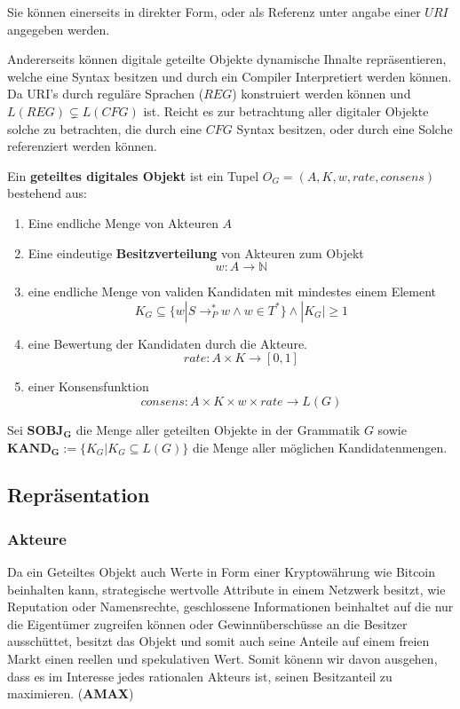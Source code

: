 \documentclass[]{article}
\newtheorem{mydef}{Definition}
\begin{document}
Sie können einerseits in direkter Form, oder als Referenz unter angabe einer $URI$ angegeben werden.

Andererseits können digitale geteilte Objekte dynamische Ihnalte repräsentieren, welche eine Syntax besitzen und durch ein Compiler Interpretiert werden können. Da URI's durch reguläre Sprachen ($REG$) konstruiert werden können und $L(REG) \subsetneq L(CFG)$ ist. Reicht es zur betrachtung aller digitaler Objekte 
solche zu betrachten, die durch eine $CFG$ Syntax besitzen, oder durch eine Solche referenziert werden können.

Ein \textbf{geteiltes digitales Objekt} ist ein Tupel $O_G=(A, K, w, rate, consens)$ bestehend aus:

\begin{enumerate}
\item Eine endliche Menge von Akteuren $A$
\item Eine eindeutige \textbf{Besitzverteilung} von Akteuren zum Objekt
  \[w: A \rightarrow \mathbb{N}\]
\item eine endliche Menge von validen Kandidaten mit mindestes einem Element 
  \[K_G \subseteq \{w|S \rightarrow^*_P w \land w\in T^* \} \land |K_G| \geq 1\] 
\item eine Bewertung der Kandidaten durch die Akteure. 
  \[rate: A\times K \rightarrow [0,1]\]
\item einer Konsensfunktion
  \[consens: A\times K\times w \times rate \rightarrow L(G)\] 
\end{enumerate}

Sei $\mathbf{SOBJ_G}$ die Menge aller geteilten Objekte in der Grammatik $G$ sowie 
 $\mathbf{KAND_G}:= \{ K_G | K_G \subseteq L(G) \}$ die Menge aller möglichen Kandidatenmengen.


\subsection {Repräsentation}

\subsubsection {Akteure}


Da ein Geteiltes Objekt auch Werte in Form einer Kryptowährung wie Bitcoin beinhalten kann, strategische wertvolle Attribute in einem Netzwerk besitzt, wie Reputation oder Namensrechte, geschlossene Informationen beinhaltet auf die nur die Eigentümer zugreifen können oder Gewinnüberschüsse an die Besitzer ausschüttet, besitzt das Objekt und somit auch seine Anteile auf einem freien Markt einen reellen und spekulativen Wert. Somit könenn wir davon ausgehen, dass es im Interesse jedes rationalen Akteurs ist, seinen Besitzanteil zu maximieren. (\textbf{AMAX})
\end{document}
